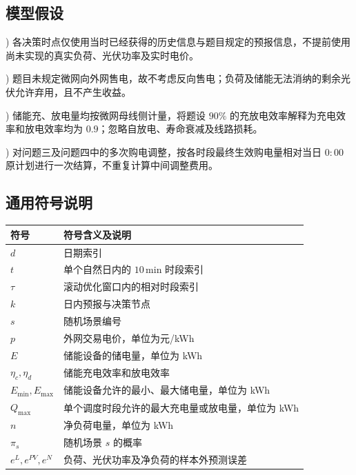 \documentclass[zihao=-4,a4paper,UTF8,fontset=none]{ctexart}
\begin{document}
\subsection{模型假设}
) 各决策时点仅使用当时已经获得的历史信息与题目规定的预报信息，不提前使用尚未实现的真实负荷、光伏功率及实时电价。

) 题目未规定微网向外网售电，故不考虑反向售电；负荷及储能无法消纳的剩余光伏允许弃用，且不产生收益。

) 储能充、放电量均按微网母线侧计量，将题设 $90\%$ 的充放电效率解释为充电效率和放电效率均为 $0.9$；忽略自放电、寿命衰减及线路损耗。

) 对问题三及问题四中的多次购电调整，按各时段最终生效购电量相对当日 $0{:}00$ 原计划进行一次结算，不重复计算中间调整费用。

\subsection{通用符号说明}

\begin{center}
\renewcommand{\arraystretch}{1.30}
\setlength{\tabcolsep}{8pt}
\begin{tabularx}{0.92\textwidth}{
    >{\centering\arraybackslash}p{}
    >{\centering\arraybackslash}X
}
    \toprule
    符号 & 符号含义及说明 \\
    \midrule

    $d$
    & 日期索引 \\

    $t$
    & 单个自然日内的 $10\,\mathrm{min}$ 时段索引 \\

    $\tau$
    & 滚动优化窗口内的相对时段索引 \\

    $k$
    & 日内预报与决策节点 \\

    $s$
    & 随机场景编号 \\

    $p$
    & 外网交易电价，单位为元/kWh \\

    $E$
    & 储能设备的储电量，单位为 kWh \\

    $\eta_c,\eta_d$
    & 储能充电效率和放电效率 \\

    $E_{\min},E_{\max}$
    & 储能设备允许的最小、最大储电量，单位为 kWh \\

    $Q_{\max}$
    & 单个调度时段允许的最大充电量或放电量，单位为 kWh \\

    $n$
    & 净负荷电量，单位为 kWh \\

    $\pi_s$
    & 随机场景 $s$ 的概率 \\

    $e^{L},e^{PV},e^{N}$
    & 负荷、光伏功率及净负荷的样本外预测误差 \\

    \bottomrule
\end{tabularx}
\end{center}
\end{document}
